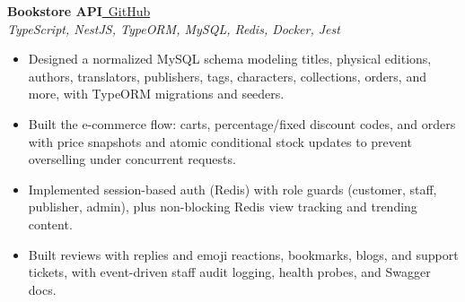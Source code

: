 \documentclass[a4paper,10pt]{article}
\newcommand{\projectheader}[3]{%
  \noindent\textbf{#1}\hfill\href{#2}{\small\faGithub\ \color{linkblue}GitHub}\\[-2pt]
  {\small\color{medgray}\textit{#3}}
  \vspace{2pt}
}
\begin{document}
\projectheader
  {Bookstore API}
  {https://github.com/1mimhe/bookstore-nest}
  {TypeScript, NestJS, TypeORM, MySQL, Redis, Docker, Jest}

\begin{itemize}
  \item Designed a normalized MySQL schema modeling titles, physical editions, authors, translators, publishers, tags, characters, collections, orders, and more, with TypeORM migrations and seeders.
  \item Built the e-commerce flow: carts, percentage/fixed discount codes, and orders with price snapshots and atomic conditional stock updates to prevent overselling under concurrent requests.
  \item Implemented session-based auth (Redis) with role guards (customer, staff, publisher, admin), plus non-blocking Redis view tracking and trending content.
  \item Built reviews with replies and emoji reactions, bookmarks, blogs, and support tickets, with event-driven staff audit logging, health probes, and Swagger docs.
\end{itemize}
\end{document}
